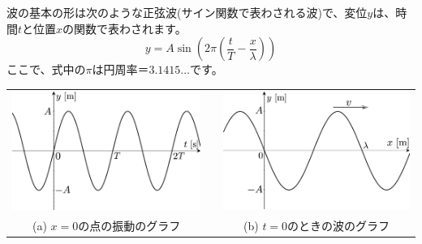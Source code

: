 波の基本の形は次のような正弦波(サイン関数で表わされる波)で、変位$y$は、時間$t$と位置$x$の関数で表わされます。
\[
y = A \sin\left(2\pi \left(\frac{t}{T}-\frac{x}{\lambda}\right)\right)
\]
ここで、式中の$\pi$は円周率＝$3.1415\ldots$です。
\begin{center}
\begin{tabular}{ccc}
\includegraphics[scale=0.14]{01_Wave/wave2.eps}&&
\includegraphics[scale=0.14]{01_Wave/wave3.eps}\\
(a) $x=0$の点の振動のグラフ && (b) $t=0$のときの波のグラフ\\
\end{tabular}
\end{center}




